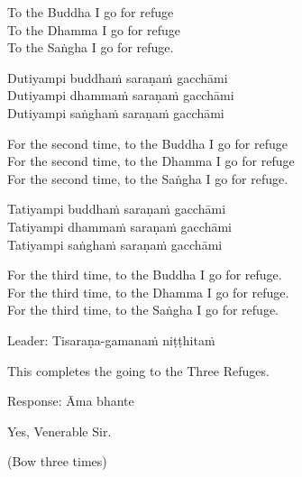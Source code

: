 \begin{english}
To the Buddha I go for refuge\\
To the Dhamma I go for refuge\\
To the Saṅgha I go for refuge.\\
\end{english}

Dutiyampi buddhaṁ saraṇaṁ gacchāmi\\
Dutiyampi dhammaṁ saraṇaṁ gacchāmi\\
Dutiyampi saṅghaṁ saraṇaṁ gacchāmi\\

\begin{english}
For the second time, to the Buddha I go for refuge\\
For the second time, to the Dhamma I go for refuge\\
For the second time, to the Saṅgha I go for refuge.\\
\end{english}

Tatiyampi buddhaṁ saraṇaṁ gacchāmi\\
Tatiyampi dhammaṁ saraṇaṁ gacchāmi\\
Tatiyampi saṅghaṁ saraṇaṁ gacchāmi\\

\begin{english}
For the third time, to the Buddha I go for refuge.\\
For the third time, to the Dhamma I go for refuge.\\
For the third time, to the Saṅgha I go for refuge.\\
\end{english}

Leader: Tisaraṇa-gamanaṁ niṭṭhitaṁ\\

\begin{english}
This completes the going to the Three Refuges.\\
\end{english}

Response: Āma bhante\\

\begin{english}
Yes, Venerable Sir.\\
\end{english}

\begin{center}
(Bow three times)\\
\end{center}

